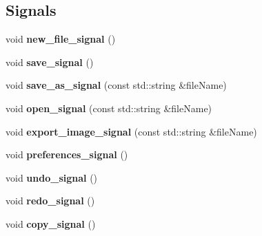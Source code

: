 \subsection*{Signals}
\begin{DoxyCompactItemize}
\item 
\hypertarget{classBixelWindow_a0ca7305900c3368348c36dbd73a51af9}{void {\bfseries new\-\_\-file\-\_\-signal} ()}\label{classBixelWindow_a0ca7305900c3368348c36dbd73a51af9}

\item 
\hypertarget{classBixelWindow_ac3542a30d554c494749f81c4928e4691}{void {\bfseries save\-\_\-signal} ()}\label{classBixelWindow_ac3542a30d554c494749f81c4928e4691}

\item 
\hypertarget{classBixelWindow_a184916c5970b4189571c61a40bcddb81}{void {\bfseries save\-\_\-as\-\_\-signal} (const std\-::string \&file\-Name)}\label{classBixelWindow_a184916c5970b4189571c61a40bcddb81}

\item 
\hypertarget{classBixelWindow_a1f5cdec267152e7c84fa3430c4cea442}{void {\bfseries open\-\_\-signal} (const std\-::string \&file\-Name)}\label{classBixelWindow_a1f5cdec267152e7c84fa3430c4cea442}

\item 
\hypertarget{classBixelWindow_a64703a78a6b4e436248dbed135fe5420}{void {\bfseries export\-\_\-image\-\_\-signal} (const std\-::string \&file\-Name)}\label{classBixelWindow_a64703a78a6b4e436248dbed135fe5420}

\item 
\hypertarget{classBixelWindow_af52996e623d4b53b5dc905c931960dc1}{void {\bfseries preferences\-\_\-signal} ()}\label{classBixelWindow_af52996e623d4b53b5dc905c931960dc1}

\item 
\hypertarget{classBixelWindow_a94c52d6d03787661d8cb142657cfebbd}{void {\bfseries undo\-\_\-signal} ()}\label{classBixelWindow_a94c52d6d03787661d8cb142657cfebbd}

\item 
\hypertarget{classBixelWindow_aaec5ff0c79673adf41f9d11acf8d696d}{void {\bfseries redo\-\_\-signal} ()}\label{classBixelWindow_aaec5ff0c79673adf41f9d11acf8d696d}

\item 
\hypertarget{classBixelWindow_a752d221cb9e200ee23a3ad0cf20fd8b8}{void {\bfseries copy\-\_\-signal} ()}\label{classBixelWindow_a752d221cb9e200ee23a3ad0cf20fd8b8}


\end{DoxyCompactItemize}
